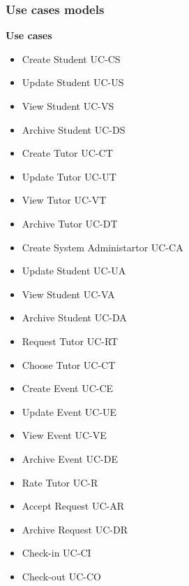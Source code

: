 \documentclass[12pt]{article}
\begin{document}
\subsubsection{Use cases models}
\begin{flushleft}
	\textbf{Use cases}
		\\	
		\begin{itemize}
			\item Create Student					UC-CS
			\\ \item Update Student 				UC-US
			\\ \item View Student      				UC-VS
			\\ \item Archive Student				UC-DS
			\\ \item Create Tutor					UC-CT
			\\ \item Update Tutor					UC-UT
			\\ \item View Tutor						UC-VT
			\\ \item Archive Tutor					UC-DT
			\\ \item Create System Administartor	UC-CA
			\\ \item Update Student 				UC-UA
			\\ \item View Student      				UC-VA
			\\ \item Archive Student				UC-DA		
			\\ \item Request Tutor					UC-RT
			\\ \item Choose Tutor					UC-CT
			\\ \item Create Event					UC-CE
			\\ \item Update Event					UC-UE
			\\ \item View Event						UC-VE
			\\ \item Archive Event					UC-DE
			\\ \item Rate Tutor						UC-R
			\\ \item Accept Request					UC-AR
			\\ \item Archive Request				UC-DR
			\\ \item Check-in						UC-CI
			\\ \item Check-out						UC-CO
\end{itemize}			
		
			
			\end{flushleft}
\end{document}
